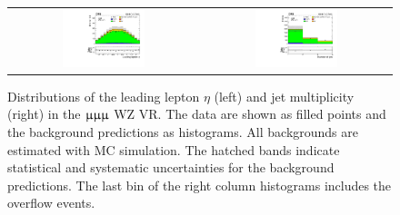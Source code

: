 \begin{figure}[tbh!]
 \begin{center}
 \begin{tabular}{cc}
 \includegraphics[width=0.45\textwidth]{figures/Part3/Selection/WZ/mumumu/lep1Eta}&
 \includegraphics[width=0.45\textwidth]{figures/Part3/Selection/WZ/mumumu/njet} \\
 \end{tabular}
 \caption{Distributions of the leading lepton $\eta$ (left) and jet multiplicity (right) in the $\upmu\upmu\upmu$ WZ VR. The data are shown as filled points and the background predictions as histograms. All backgrounds are estimated with \ac{MC} simulation. The hatched bands indicate statistical and systematic uncertainties for the background predictions. The last bin of the right column histograms includes the overflow events.}
 \label{fig:WZ_mumumu}
 \end{center}
\end{figure}


